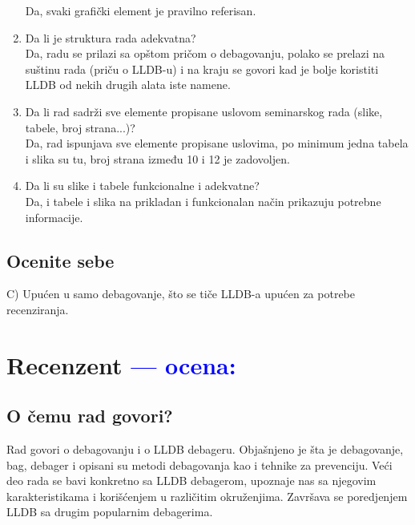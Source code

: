 \documentclass[a4paper]{report}
\newcommand{\odgovor}[1]{\textcolor{blue}{#1}}
\begin{document}
\begin{enumerate}
Da, svaki grafički element je pravilno referisan.
\item Da li je struktura rada adekvatna?\\
Da, radu se prilazi sa opštom pričom o debagovanju, polako se prelazi na suštinu rada (priču o LLDB-u) 
i na kraju se govori kad je bolje koristiti LLDB od nekih drugih alata iste namene.
\item Da li rad sadrži sve elemente propisane uslovom seminarskog rada (slike, tabele, broj strana...)?\\
Da, rad ispunjava sve elemente propisane uslovima, po minimum jedna tabela i slika su tu, broj strana 
između 10 i 12 je zadovoljen.
\item Da li su slike i tabele funkcionalne i adekvatne?\\
Da, i tabele i slika na prikladan i funkcionalan način prikazuju potrebne informacije.
\end{enumerate}

\section{Ocenite sebe}
C) Upućen u samo debagovanje, što se tiče LLDB-a upućen za potrebe recenziranja.

\chapter{Recenzent \odgovor{--- ocena:} }


\section{O čemu rad govori?}
Rad govori o debagovanju i o LLDB debageru. Objašnjeno je šta je debagovanje, bag, debager i opisani su metodi debagovanja kao i tehnike za prevenciju. Veći deo rada se bavi konkretno sa LLDB debagerom, upoznaje nas sa njegovim karakteristikama i korišćenjem u različitim okruženjima. Završava se poredjenjem LLDB sa drugim popularnim debagerima.
\end{document}
